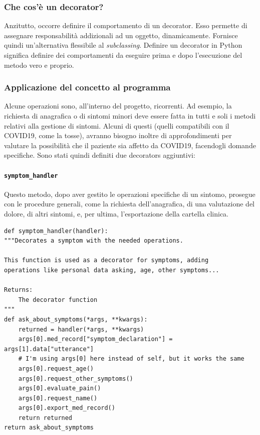 \subsubsection{Che cos'è un decorator?}
Anzitutto, occorre definire il comportamento di un decorator. Esso permette di assegnare responsabilità addizionali ad un oggetto, dinamicamente. Fornisce quindi un'alternativa flessibile al \textit{subclassing}. Definire un decorator in Python significa definire dei comportamenti da eseguire prima e dopo l'esecuzione del metodo vero e proprio.
\subsubsection{Applicazione del concetto al programma}
Alcune operazioni sono, all'interno del progetto, ricorrenti. Ad esempio, la richiesta di anagrafica o di sintomi minori deve essere fatta in tutti e soli i metodi relativi alla gestione di sintomi. Alcuni di questi (quelli compatibili con il COVID19, come la tosse), avranno bisogno inoltre di approfondimenti per valutare la possibilità che il paziente sia affetto da COVID19, facendogli domande specifiche. Sono stati quindi definiti due decorators aggiuntivi:
\paragraph{\texttt{symptom\_handler}} Questo metodo, dopo aver gestito le operazioni specifiche di un sintomo, prosegue con le procedure generali, come la richiesta dell'anagrafica, di una valutazione del dolore, di altri sintomi, e, per ultima, l'esportazione della cartella clinica.
\begin{verbatim}
def symptom_handler(handler):
"""Decorates a symptom with the needed operations.

This function is used as a decorator for symptoms, adding
operations like personal data asking, age, other symptoms...

Returns:
    The decorator function
"""
def ask_about_symptoms(*args, **kwargs):
    returned = handler(*args, **kwargs)
    args[0].med_record["symptom_declaration"] = args[1].data["utterance"]
    # I'm using args[0] here instead of self, but it works the same
    args[0].request_age()
    args[0].request_other_symptoms()
    args[0].evaluate_pain()
    args[0].request_name()
    args[0].export_med_record()
    return returned
return ask_about_symptoms
\end{verbatim}
